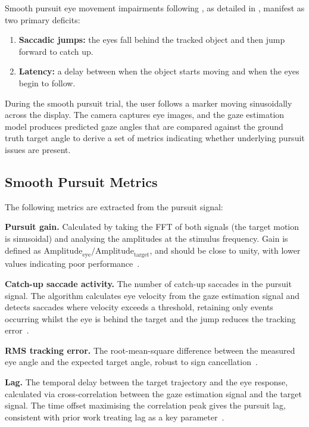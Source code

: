 Smooth pursuit eye movement impairments following , as detailed in , manifest as two primary deficits:

\begin{enumerate}
    \item \textbf{Saccadic jumps:} the eyes fall behind the tracked object and then jump forward to catch up.
    \item \textbf{Latency:} a delay between when the object starts moving and when the eyes begin to follow.
\end{enumerate}

During the smooth pursuit trial, the user follows a marker moving sinusoidally across the display. The camera captures eye images, and the gaze estimation model produces predicted gaze angles that are compared against the ground truth target angle to derive a set of metrics indicating whether underlying pursuit issues are present.

\subsection{Smooth Pursuit Metrics}

The following metrics are extracted from the pursuit signal:

\textbf{Pursuit gain.} Calculated by taking the FFT of both signals (the target motion is sinusoidal) and analysing the amplitudes at the stimulus frequency. Gain is defined as $\text{Amplitude}_{\text{eye}} / \text{Amplitude}_{\text{target}}$, and should be close to unity, with lower values indicating poor performance~\cite{devillerssidani2023oculomotor}.

\textbf{Catch-up saccade activity.} The number of catch-up saccades in the pursuit signal. The algorithm calculates eye velocity from the gaze estimation signal and detects saccades where velocity exceeds a threshold, retaining only events occurring whilst the eye is behind the target and the jump reduces the tracking error~\cite{devillerssidani2023oculomotor}.

\textbf{RMS tracking error.} The root-mean-square difference between the measured eye angle and the expected target angle, robust to sign cancellation~\cite{kellar2018comparing}.

\textbf{Lag.} The temporal delay between the target trajectory and the eye response, calculated via cross-correlation between the gaze estimation signal and the target signal. The time offset maximising the correlation peak gives the pursuit lag, consistent with prior work treating lag as a key parameter~\cite{devillerssidani2023oculomotor}.

